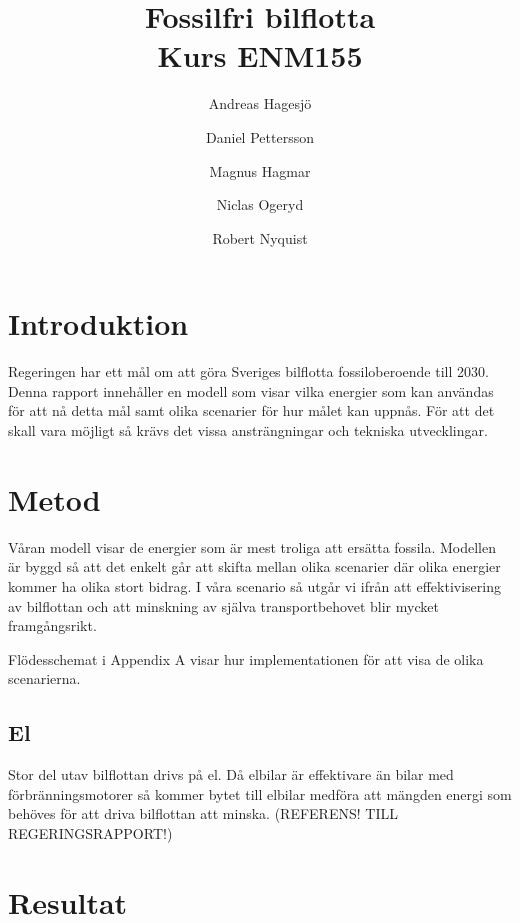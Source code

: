 \documentclass[a4paper,11pt,fleqn, titlepage]{article}
\author{Andreas Hagesjö \and Daniel Pettersson \and
Magnus Hagmar \and Niclas Ogeryd \and Robert Nyquist}
\title{Fossilfri bilflotta \\ Kurs ENM155}
\begin{document}
\maketitle

\section{Introduktion}
Regeringen har ett mål om att göra Sveriges bilflotta fossiloberoende till 2030. Denna rapport innehåller en modell som visar vilka energier som kan användas för att nå detta mål samt olika scenarier för hur målet kan uppnås.
För att det skall vara möjligt så krävs det vissa ansträngningar och tekniska utvecklingar.


\section{Metod}

Våran modell visar de energier som är mest troliga att ersätta fossila. Modellen är byggd så att det enkelt går att skifta mellan olika scenarier där olika energier kommer ha olika stort bidrag.
I våra scenario så utgår vi ifrån att effektivisering av bilflottan och att minskning av själva transportbehovet blir mycket framgångsrikt.


Flödesschemat i Appendix A visar hur implementationen för att visa de olika scenarierna.

\subsection{El}

Stor del utav bilflottan drivs på el. Då elbilar är effektivare än bilar med förbränningsmotorer så kommer bytet till elbilar medföra att mängden energi som behöves för att driva bilflottan att minska. (REFERENS! TILL REGERINGSRAPPORT!)

\section{Resultat}
\end{document}
